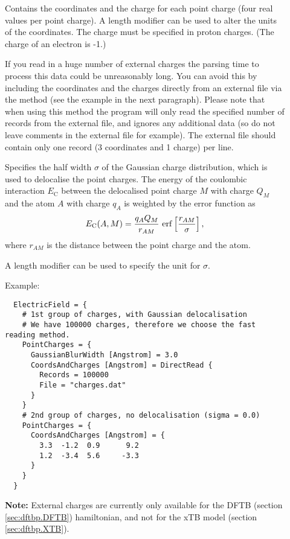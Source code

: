 \begin{description}
\item[] Contains the
  coordinates and the charge for each point charge (four real values
  per point charge). A length modifier can be used to alter the units
  of the coordinates. The charge must be specified in proton
  charges. (The charge of an electron is -1.)

  If you read in a huge number of external charges the parsing time to
  process this data could be unreasonably long. You can avoid this by
  including the coordinates and the charges directly from an external
  file via the  method (see the example in the next
  paragraph). Please note that when using this method the program will
  only read the specified number of records from the external file,
  and ignores any additional data (so do not leave comments in the
  external file for example). The external file should contain only
  one record (3 coordinates and 1 charge) per line.

\item[] Specifies the
  half width $\sigma$ of the Gaussian charge distribution, which is
  used to delocalise the point charges.  The energy of the coulombic
  interaction $E_{\text{C}}$ between the delocalised point charge $M$
  with charge $Q_M$ and the atom $A$ with charge $q_A$ is weighted by
  the error function as
  \begin{equation*}
    E_{\text{C}}(A,M) = \frac{q_A Q_M}{r_{AM}}\,
    \operatorname{erf}\left[\frac{r_{AM}}{\sigma}\right]
    \text,
  \end{equation*}
  where $r_{AM}$ is the distance between the point charge and the
  atom.

  A length modifier can be used to specify the unit for $\sigma$.

  Example:\invparskip
\begin{verbatim}
  ElectricField = {
    # 1st group of charges, with Gaussian delocalisation
    # We have 100000 charges, therefore we choose the fast reading method.
    PointCharges = {
      GaussianBlurWidth [Angstrom] = 3.0
      CoordsAndCharges [Angstrom] = DirectRead {
        Records = 100000
        File = "charges.dat"
      }
    }
    # 2nd group of charges, no delocalisation (sigma = 0.0)
    PointCharges = {
      CoordsAndCharges [Angstrom] = {
        3.3  -1.2  0.9      9.2
        1.2  -3.4  5.6     -3.3
      }
    }
  }
\end{verbatim}

\textbf{Note:} External charges are currently only available for the
DFTB (section \ref{sec:dftbp.DFTB}) hamiltonian, and not for the xTB
model (section \ref{sec:dftbp.XTB}).

\end{description}

